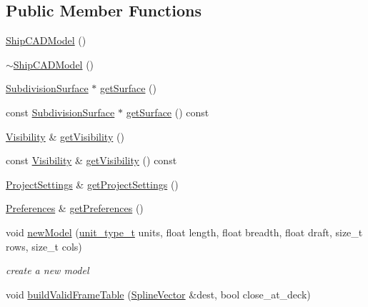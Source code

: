\subsection*{Public Member Functions}
\begin{DoxyCompactItemize}
\item 
\hyperlink{classShipCAD_1_1ShipCADModel_abede72e53058c2ecf8dc2c4b2a7c8014}{Ship\+C\+A\+D\+Model} ()
\item 
\hyperlink{classShipCAD_1_1ShipCADModel_a9731f3987d1f1d31d9df48f129a65fea}{$\sim$\+Ship\+C\+A\+D\+Model} ()
\item 
\hyperlink{classShipCAD_1_1SubdivisionSurface}{Subdivision\+Surface} $\ast$ \hyperlink{classShipCAD_1_1ShipCADModel_a6941ad7a2b167419e844823fa8461019}{get\+Surface} ()
\item 
const \hyperlink{classShipCAD_1_1SubdivisionSurface}{Subdivision\+Surface} $\ast$ \hyperlink{classShipCAD_1_1ShipCADModel_ab0b738e5f12d8f7046570704fd801cc6}{get\+Surface} () const 
\item 
\hyperlink{classShipCAD_1_1Visibility}{Visibility} \& \hyperlink{classShipCAD_1_1ShipCADModel_a50cca4c783baeba58c8068c9b8a5d6a4}{get\+Visibility} ()
\item 
const \hyperlink{classShipCAD_1_1Visibility}{Visibility} \& \hyperlink{classShipCAD_1_1ShipCADModel_a29d8990bbd06e11c93c6639b76b9fde1}{get\+Visibility} () const 
\item 
\hyperlink{classShipCAD_1_1ProjectSettings}{Project\+Settings} \& \hyperlink{classShipCAD_1_1ShipCADModel_a94a8eed8ac8ff4ad8287a0a1113e3271}{get\+Project\+Settings} ()
\item 
\hyperlink{classShipCAD_1_1Preferences}{Preferences} \& \hyperlink{classShipCAD_1_1ShipCADModel_aa6af8872deba5b401ac575a85901a265}{get\+Preferences} ()
\item 
void \hyperlink{classShipCAD_1_1ShipCADModel_adcf0db573afa7c865de68d0b36d41f15}{new\+Model} (\hyperlink{namespaceShipCAD_ac6a7a28b4b063771afae92decb602da5}{unit\+\_\+type\+\_\+t} units, float length, float breadth, float draft, size\+\_\+t rows, size\+\_\+t cols)
\begin{DoxyCompactList}\small\item\em create a new model \end{DoxyCompactList}\item 
void \hyperlink{classShipCAD_1_1ShipCADModel_a89923c0700e57eebf85332cfc9180765}{build\+Valid\+Frame\+Table} (\hyperlink{namespaceShipCAD_a053b941b2c87049bb9380428d4d5a056}{Spline\+Vector} \&dest, bool close\+\_\+at\+\_\+deck)

\end{DoxyCompactItemize}
